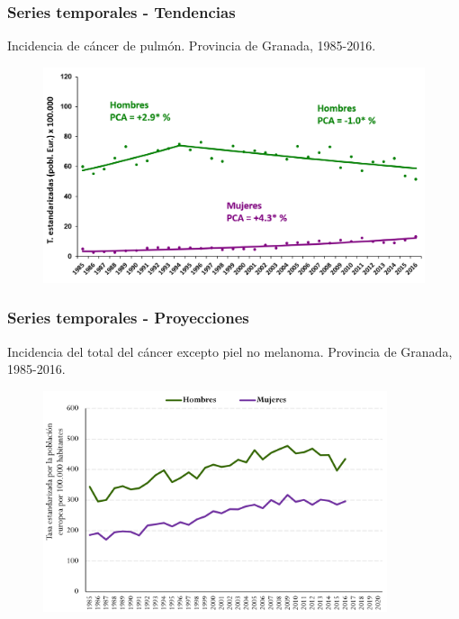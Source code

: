 \documentclass{beamer}
\begin{document}

\begin{frame}\frametitle{Series temporales - Tendencias}
	
	\centering
	Incidencia de cáncer de pulmón. Provincia de Granada, 1985-2016.
	\begin{figure}
		\centering
		\includegraphics[width=\textwidth]{images/tendencias_pulmon.png}
	\end{figure}
	
\end{frame}


\begin{frame}\frametitle{Series temporales - Proyecciones}
	
	\footnotesize{Incidencia del total del cáncer excepto piel no melanoma. Provincia de Granada, 1985-2016.}
	\begin{figure}
		\centering
		\includegraphics[width=0.9\textwidth]{images/proyecciones0.png}
	\end{figure}
		
\end{frame}
\end{document}
